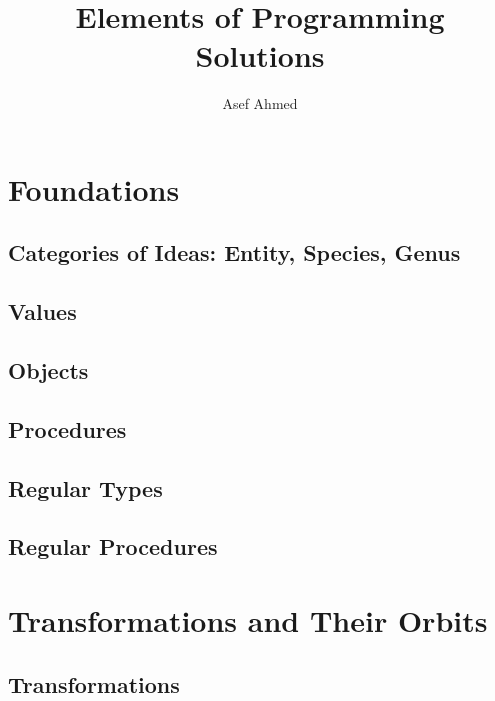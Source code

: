 





\title{Elements of Programming Solutions}

\author{Asef Ahmed}



\maketitle

\section{Foundations}

\subsection{Categories of Ideas: Entity, Species, Genus}

\subsection{Values}


\subsection{Objects}

\subsection{Procedures}

\subsection{Regular Types}


\subsection{Regular Procedures}


\section{Transformations and Their Orbits}

\subsection{Transformations}

    

